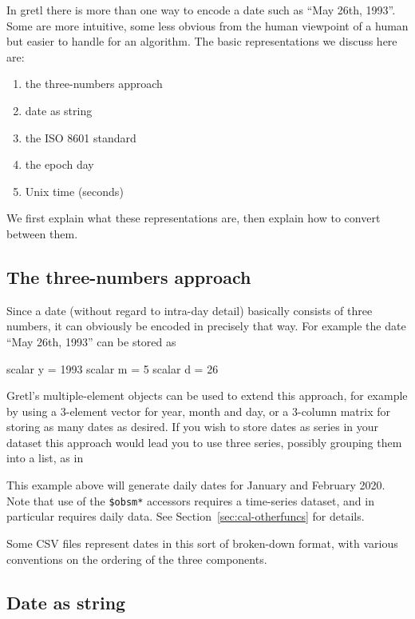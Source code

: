 In gretl there is more than one way to encode a date such as ``May
26th, 1993''. Some are more intuitive, some less obvious from the
human viewpoint of a human but easier to handle for an algorithm. The
basic representations we discuss here are:
\begin{enumerate}
\item the three-numbers approach
\item date as string
\item the ISO 8601 standard
\item the epoch day
\item Unix time (seconds)
\end{enumerate}
We first explain what these representations are, then explain how
to convert between them.

\subsection{The three-numbers approach}
\label{sec:cal-3numbers}

Since a date (without regard to intra-day detail) basically consists
of three numbers, it can obviously be encoded in precisely that way.
For example the date ``May 26th, 1993'' can be stored as
\begin{code}
  scalar y = 1993
  scalar m = 5
  scalar d = 26
\end{code}

Gretl's multiple-element objects can be used to extend this approach,
for example by using a 3-element vector for year, month and day, or a
3-column matrix for storing as many dates as desired. If you wish to
store dates as series in your dataset this approach would lead you to
use three series, possibly grouping them into a list, as in
This example above will generate daily dates for January and February
2020. Note that use of the \verb|$obsm*| accessors requires a
time-series dataset, and  in particular requires
daily data. See Section~\ref{sec:cal-otherfuncs} for details.

Some CSV files represent dates in this sort of broken-down format,
with various conventions on the ordering of the three components.

\subsection{Date as string}
\label{sec:cal-generic-string}


